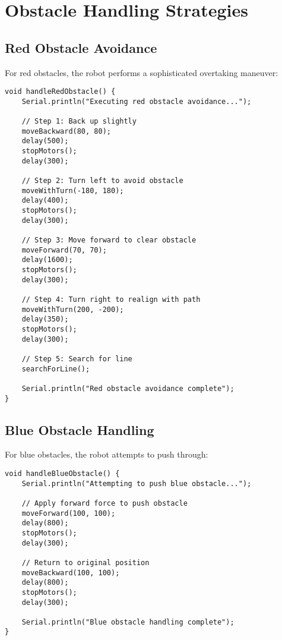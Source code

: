 \documentclass[12pt,a4paper]{article}
\begin{document}
\section{Obstacle Handling Strategies}

\subsection{Red Obstacle Avoidance}

For red obstacles, the robot performs a sophisticated overtaking maneuver:

\begin{lstlisting}[caption={Red Obstacle Handling}, label={lst:red_obstacle}]
void handleRedObstacle() {
    Serial.println("Executing red obstacle avoidance...");
    
    // Step 1: Back up slightly
    moveBackward(80, 80);
    delay(500);
    stopMotors();
    delay(300);
    
    // Step 2: Turn left to avoid obstacle
    moveWithTurn(-180, 180);
    delay(400);
    stopMotors();
    delay(300);
    
    // Step 3: Move forward to clear obstacle
    moveForward(70, 70);
    delay(1600);
    stopMotors();
    delay(300);
    
    // Step 4: Turn right to realign with path
    moveWithTurn(200, -200);
    delay(350);
    stopMotors();
    delay(300);
    
    // Step 5: Search for line
    searchForLine();
    
    Serial.println("Red obstacle avoidance complete");
}
\end{lstlisting}

\subsection{Blue Obstacle Handling}

For blue obstacles, the robot attempts to push through:

\begin{lstlisting}[caption={Blue Obstacle Handling}, label={lst:blue_obstacle}]
void handleBlueObstacle() {
    Serial.println("Attempting to push blue obstacle...");
    
    // Apply forward force to push obstacle
    moveForward(100, 100);
    delay(800);
    stopMotors();
    delay(300);
    
    // Return to original position
    moveBackward(100, 100);
    delay(800);
    stopMotors();
    delay(300);
    
    Serial.println("Blue obstacle handling complete");
}
\end{lstlisting}
\end{document}
